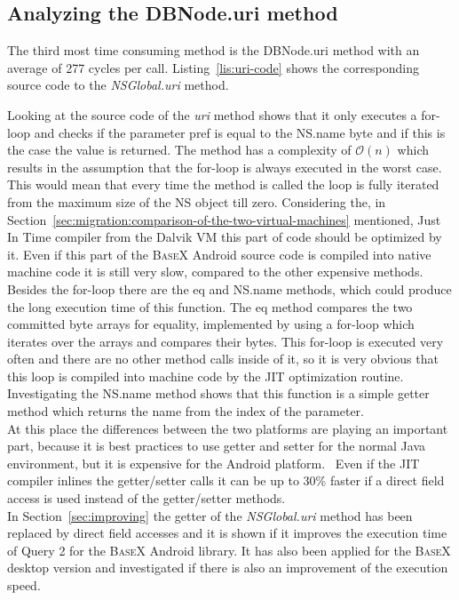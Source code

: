 \subsection*{Analyzing the \textsf{DBNode.uri} method}
\label{sec:analyzing-the-dbnode.uri-method}
The third most time consuming method is the \textsf{DBNode.uri} method with an average of 277 cycles per call.
Listing~\ref{lis:uri-code} shows the corresponding source code to the \textit{NSGlobal.uri} method.
		
Looking at the source code of the \textit{uri} method shows that it only executes a for-loop and checks if the parameter \textsf{pref} is equal to the \textsf{NS.name} byte and if this is the case the value is returned.
The method has a complexity of $\mathcal O(n)$ which results in the assumption that the for-loop is always executed in the worst case.
This would mean that every time the method is called the loop is fully iterated from the maximum size of the \textsf{NS} object till zero.
Considering the, in Section~\ref{sec:migration:comparison-of-the-two-virtual-machines} mentioned, Just In Time compiler from the Dalvik VM this part of code should be optimized by it.
Even if this part of the \textsc{BaseX} Android source code is compiled into native machine code it is still very slow, compared to the other expensive methods.
Besides the for-loop there are the \textsf{eq} and \textsf{NS.name} methods, which could produce the long execution time of this function.
The \textsf{eq} method compares the two committed byte arrays for equality, implemented by using a for-loop which iterates over the arrays and compares their bytes.
This for-loop is executed very often and there are no other method calls inside of it, so it is very obvious that this loop is compiled into machine code by the JIT optimization routine.\\
Investigating the \textsf{NS.name} method shows that this function is a simple getter method which returns the name from the index of the parameter.\\
At this place the differences between the two platforms are playing an important part, because it is best practices to use getter and setter for the normal Java environment, but it is expensive for the Android platform.~\cite{toninievlautatingandroid}
Even if the JIT compiler inlines the getter/setter calls it can be up to 30\% faster if a direct field access is used instead of the getter/setter methods.~\cite{toninianalysis}\\
In Section~\ref{sec:improving} the getter of the \textit{NSGlobal.uri} method has been replaced by direct field accesses and it is shown if it improves the execution time of Query 2 for the \textsc{BaseX} Android library.
It has also been applied for the \textsc{BaseX} desktop version and investigated if there is also an improvement of the execution speed.

